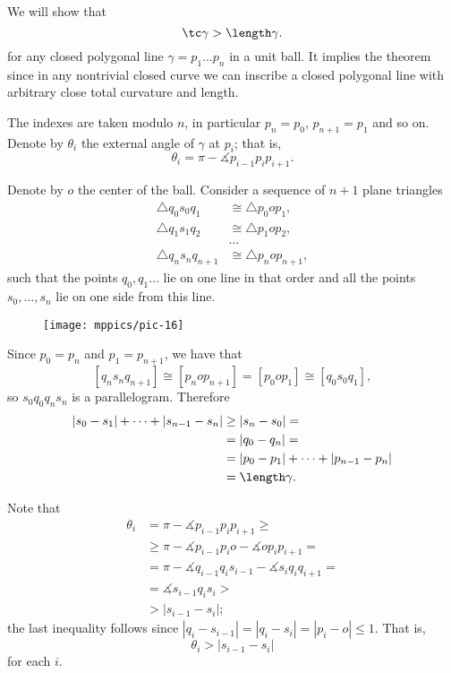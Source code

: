 We will show that 
\[\tc\gamma> \length\gamma.\]
for any closed polygonal line $\gamma=p_1\dots p_{n}$ in a unit ball.
It implies the theorem since in any nontrivial closed curve we can inscribe a closed polygonal line with arbitrary close total curvature and length.

The indexes are taken modulo $n$, in particular $p_{n}=p_0$, $p_{n+1}=p_1$ and so on.
Denote by $\theta_i$ the external angle of $\gamma$ at $p_i$;
that is,
\[\theta_i=\pi-\measuredangle p_{i-1}p_ip_{i+1}.\]

Denote by $o$ the center of the ball.
Consider a sequence of $n+1$ plane triangles
\begin{align*}
\triangle q_0s_0q_1
&\cong 
\triangle p_0op_1,
\\
\triangle q_1s_1q_2
&\cong 
\triangle p_1op_2,
\\
&\dots
\\
\triangle q_{n}s_nq_{n+1}
&\cong 
\triangle p_nop_{n+1},
\end{align*}
such that the points $q_0,q_1\dots$ lie on one line in that order and all the points $s_0,\dots,s_n$ lie on one side from this line.

\begin{figure}[h!]
\vskip-0mm
\centering
\texttt{[image: mppics/pic-16]}
\vskip0mm
\end{figure}

Since $p_0=p_n$ and $p_1=p_{n+1}$, we have that
\[[q_{n}s_nq_{n+1}]\cong 
[p_nop_{n+1}]=[p_0op_1]\cong[q_{0}s_0q_1],\]
so $s_0q_0q_ns_n$ is a parallelogram.
Therefore
\begin{align*}
|s_0-s_1|+\dots+|s_{n-1}-s_n|
&\ge|s_n-s_0|=
\\
&=|q_0-q_n|=
\\
&=|p_0-p_1|+\dots+|p_{n-1}-p_n|
\\
&=\length \gamma.
\end{align*}

Note that 
\begin{align*}
\theta_i&=\pi-\measuredangle p_{i-1}p_ip_{i+1}\ge
\\
&\ge\pi-\measuredangle p_{i-1}p_io-\measuredangle op_ip_{i+1}=
\\
&=\pi-\measuredangle q_{i-1}q_is_{i-1}-\measuredangle s_iq_iq_{i+1}=
\\
&=\measuredangle s_{i-1}q_is_i>
\\
&>|s_{i-1}-s_i|;
\end{align*}
the last inequality follows since $|q_i-s_{i-1}|=|q_i-s_i|=|p_i-o|\le 1$.
That is, 
\[\theta_i>|s_{i-1}-s_i|\]
for each $i$.

